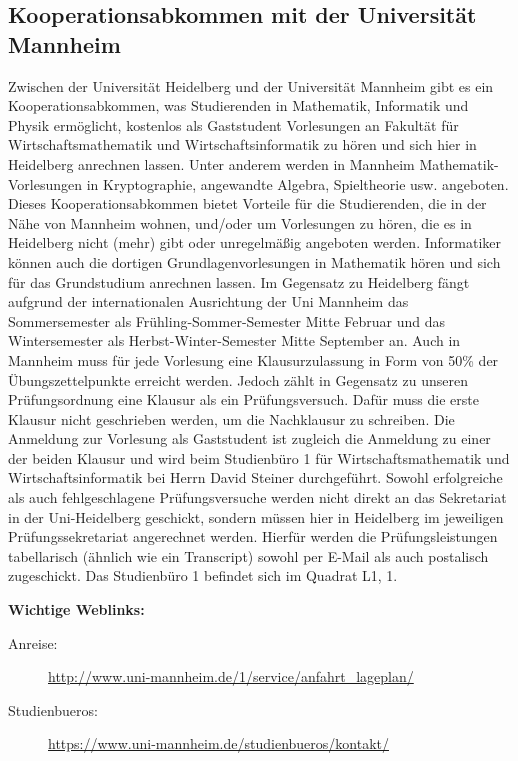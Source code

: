 \subsection*{Kooperationsabkommen mit der Universität Mannheim}
Zwischen der Universität Heidelberg und der Universität Mannheim gibt es ein Kooperationsabkommen, was Studierenden in Mathematik, Informatik und Physik ermöglicht, kostenlos als Gaststudent Vorlesungen an Fakultät für Wirtschaftsmathematik und Wirtschaftsinformatik zu hören und sich hier in Heidelberg anrechnen lassen. Unter anderem werden in Mannheim Mathematik-Vorlesungen in Kryptographie, angewandte Algebra, Spieltheorie usw. angeboten. Dieses Kooperationsabkommen bietet Vorteile für die Studierenden, die in der Nähe von Mannheim wohnen, und/oder um Vorlesungen zu hören, die es in Heidelberg nicht (mehr) gibt oder unregelmäßig angeboten werden. Informatiker können auch die dortigen Grundlagenvorlesungen in Mathematik hören und sich für das Grundstudium anrechnen lassen. Im Gegensatz zu Heidelberg fängt aufgrund der internationalen Ausrichtung der Uni Mannheim das Sommersemester als Frühling-Sommer-Semester Mitte Februar und das Wintersemester als Herbst-Winter-Semester Mitte September an. Auch in Mannheim muss für jede Vorlesung eine Klausurzulassung in Form von 50\% der Übungszettelpunkte erreicht werden. Jedoch zählt in Gegensatz zu unseren Prüfungsordnung eine Klausur als ein Prüfungsversuch. Dafür muss die erste Klausur nicht geschrieben werden, um die Nachklausur zu schreiben. Die Anmeldung zur Vorlesung als Gaststudent ist zugleich die Anmeldung zu einer der beiden Klausur und wird beim Studienbüro 1 für Wirtschaftsmathematik und Wirtschaftsinformatik bei Herrn David Steiner durchgeführt. Sowohl erfolgreiche als auch fehlgeschlagene Prüfungsversuche werden nicht direkt an das Sekretariat in der Uni-Heidelberg geschickt, sondern müssen hier in Heidelberg im jeweiligen Prüfungssekretariat angerechnet werden. Hierfür werden die Prüfungsleistungen tabellarisch (ähnlich wie ein Transcript) sowohl per E-Mail als auch postalisch zugeschickt. Das Studienbüro 1 befindet sich im Quadrat L1, 1. 

\textbf{Wichtige Weblinks:} 
\begin{description}
\item[Anreise:] \url{http://www.uni-mannheim.de/1/service/anfahrt_lageplan/}
\item[Studienbueros:] \url{https://www.uni-mannheim.de/studienbueros/kontakt/}
\end{description}
